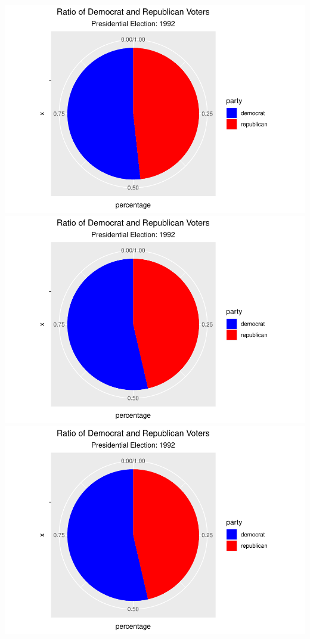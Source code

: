 \documentclass[
]{article}
\begin{document}
\includegraphics{election_files/figure-latex/anim-37.pdf}
\includegraphics{election_files/figure-latex/anim-38.pdf}
\includegraphics{election_files/figure-latex/anim-39.pdf}
\end{document}
